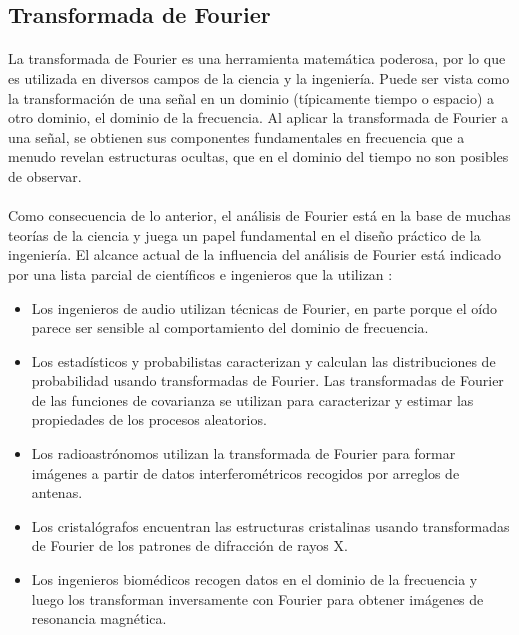 \documentclass[a4paper,12pt]{article}
\begin{document}
\subsection{Transformada de Fourier}
\paragraph{}
La transformada de Fourier es una herramienta matemática poderosa, por lo que es utilizada en diversos campos de la ciencia y la ingeniería. Puede ser vista como la transformación de una señal en un dominio (típicamente tiempo o espacio) a otro dominio, el dominio de la frecuencia. Al aplicar la transformada de Fourier a una señal, se obtienen sus componentes fundamentales en frecuencia que a menudo revelan estructuras ocultas, que en el dominio del tiempo no son posibles de observar.

\paragraph{}
Como consecuencia de lo anterior, el análisis de Fourier está en la base de muchas teorías de la ciencia y juega un papel fundamental en el diseño práctico de la ingeniería. El alcance actual de la influencia del análisis de Fourier está indicado por una lista parcial de científicos e ingenieros que la utilizan \cite{robert}:

\begin{itemize}
\item{Los ingenieros de audio utilizan técnicas de Fourier, en parte porque el oído parece ser sensible al comportamiento del dominio de frecuencia.}
\item{Los estadísticos y probabilistas caracterizan y calculan las distribuciones de probabilidad usando transformadas de Fourier. Las transformadas de Fourier de las funciones de covarianza se utilizan para caracterizar y estimar las propiedades de los procesos aleatorios.}
\item{Los radioastrónomos utilizan la transformada de Fourier para formar imágenes a partir de datos interferométricos recogidos por arreglos de antenas.}
\item{Los cristalógrafos encuentran las estructuras cristalinas usando transformadas de Fourier de los patrones de difracción de rayos X.}
\item{Los ingenieros biomédicos recogen datos en el dominio de la frecuencia y luego los transforman
inversamente con Fourier para obtener imágenes de resonancia magnética.}
\end{itemize}
\end{document}
